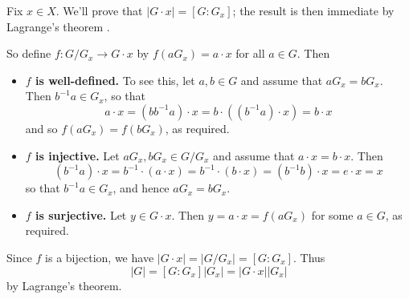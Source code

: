 \begin{cproof}
Fix $x \in X$. We'll prove that $|G \cdot x| = [G : G_x]$; the result is then immediate by Lagrange's theorem .

So define $f : G/G_x \to G \cdot x$ by $f(aG_x) = a \cdot x$ for all $a \in G$. Then
\begin{itemize}
\item \textbf{$f$ is well-defined.} To see this, let $a,b \in G$ and assume that $aG_x = bG_x$. Then $b^{-1}a \in G_x$, so that
\[ a \cdot x = (bb^{-1}a) \cdot x = b \cdot ((b^{-1}a) \cdot x) = b \cdot x \]
and so $f(aG_x) = f(bG_x)$, as required.

\item \textbf{$f$ is injective.} Let $aG_x, bG_x \in G/G_x$ and assume that $a \cdot x = b \cdot x$. Then
\[ (b^{-1}a) \cdot x = b^{-1} \cdot (a \cdot x) = b^{-1} \cdot (b \cdot x) = (b^{-1}b) \cdot x = e \cdot x = x \]
so that $b^{-1}a \in G_x$, and hence $aG_x = bG_x$.

\item \textbf{$f$ is surjective.} Let $y \in G \cdot x$. Then $y = a \cdot x = f(aG_x)$ for some $a \in G$, as required.
\end{itemize}

Since $f$ is a bijection, we have $|G \cdot x| = |G/G_x| = [G:G_x]$. Thus
\[ |G| = [G:G_x]|G_x| = |G \cdot x||G_x| \]
by Lagrange's theorem.
\end{cproof}

\todo{}